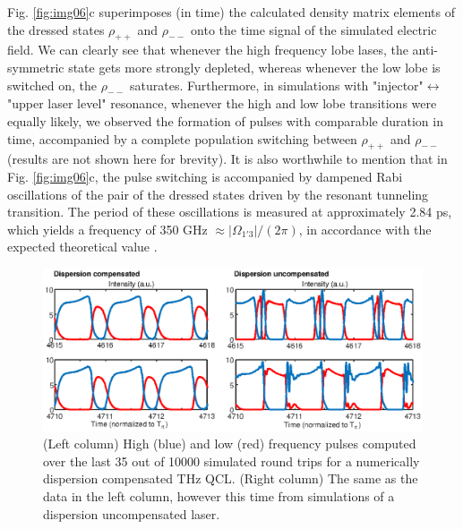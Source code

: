 \documentclass[twocolumn,secnumarabic,amssymb, nobibnotes, aps, prd]{revtex4-1}
\begin{document}
{			Fig. \ref{fig:img06}c superimposes (in time) the calculated density matrix elements of the dressed states $\rho_{++}$ and $\rho_{--}$ onto the time signal of the simulated electric field. We can clearly see that whenever the high frequency lobe lases, the anti-symmetric state gets more strongly depleted, whereas whenever the low lobe is switched on, the $\rho_{--}$ saturates. Furthermore, in simulations with "injector"$\leftrightarrow$ "upper laser level" resonance, whenever the high and low lobe transitions were equally likely, we observed the formation of pulses with comparable duration in time, accompanied by a complete population switching between $\rho_{++}$ and $\rho_{--}$ (results are not shown here for brevity). It is also worthwhile to mention that in Fig. \ref{fig:img06}c, the pulse switching is accompanied by dampened Rabi oscillations of the pair of the dressed states driven by the resonant tunneling transition. The period of these oscillations is measured at approximately 2.84 ps, which yields a frequency of 350 GHz $\approx |\Omega_{1'3}|/(2\pi)$, in accordance with the expected theoretical value \cite{callebaut2005importance}. 
			\begin{figure}[h!]
				\begin{center}
					\includegraphics[scale=.9 ]{figs/TEMPHOLEBURNING.eps}
					\caption{(Left column) High (blue) and low (red) frequency pulses computed over the last 35 out of 10000 simulated round trips for a numerically dispersion compensated THz QCL. (Right column) The same as the data in the left column, however this time from simulations of a dispersion uncompensated laser.  } \label{fig:img07}
				\end{center}	
			\end{figure}
			
}
\end{document}
